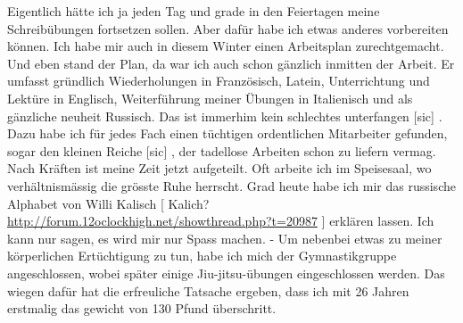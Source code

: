 \def\day{7. Januar 1943}
\mktitle

Eigentlich h\"{a}tte ich ja jeden Tag und grade in den Feiertagen meine Schreib\"{u}bungen fortsetzen sollen.
Aber daf\"{u}r habe ich etwas anderes vorbereiten k\"{o}nnen.
Ich habe mir auch in diesem Winter einen Arbeitsplan zurechtgemacht.
Und eben stand der Plan, da war ich auch schon g\"{a}nzlich inmitten der Arbeit.
Er umfasst gr\"{u}ndlich Wiederholungen in Franz\"{o}sisch, Latein, Unterrichtung und Lekt\"{u}re in Englisch, Weiterf\"{u}hrung meiner \"{U}bungen in Italienisch und als g\"{a}nzliche neuheit Russisch.
Das ist immerhim kein schlechtes unterfangen{\color{red} [sic] }.
Dazu habe ich f\"{u}r jedes Fach einen t\"{u}chtigen ordentlichen Mitarbeiter gefunden, sogar den kleinen Reiche {\color{red} [sic] }, der tadellose Arbeiten schon zu liefern vermag.
Nach Kr\"{a}ften ist meine Zeit jetzt aufgeteilt.
Oft arbeite ich im Speisesaal, wo verh\"{a}ltnism\"{a}ssig die gr\"{o}sste Ruhe herrscht.
Grad heute habe ich mir das russische Alphabet von Willi Kalisch{\color{red} [ Kalich? \url{http://forum.12oclockhigh.net/showthread.php?t=20987} ] } erkl\"{a}ren lassen.
Ich kann nur sagen, es wird mir nur Spass machen.
- Um nebenbei etwas zu meiner k\"{o}rperlichen Ert\"{u}chtigung zu tun, habe ich mich der Gymnastikgruppe angeschlossen, wobei sp\"{a}ter einige Jiu-jitsu-\"{u}bungen eingeschlossen werden.
Das wiegen daf\"{u}r hat die erfreuliche Tatsache ergeben, dass ich mit 26 Jahren erstmalig das gewicht von 130 Pfund \"{u}berschritt.

\clearpage
